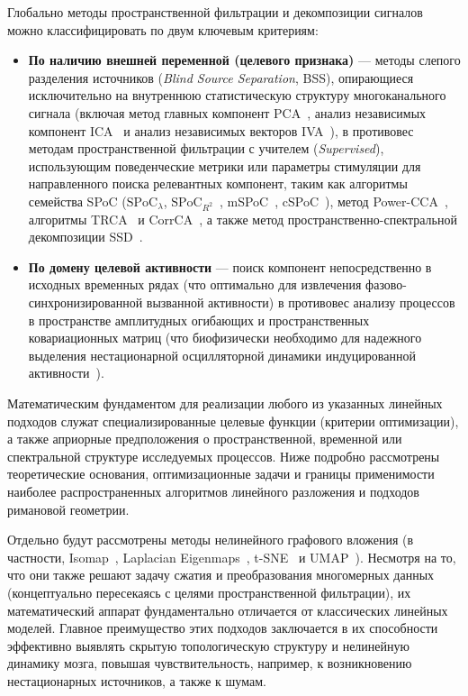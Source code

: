 Глобально методы пространственной фильтрации и декомпозиции сигналов можно классифицировать по двум ключевым критериям:
\begin{itemize}
	\item \textbf{По наличию внешней переменной (целевого признака)} --- методы слепого разделения источников (\textit{Blind Source Separation}, BSS), опирающиеся исключительно на внутреннюю статистическую структуру многоканального сигнала (включая метод главных компонент PCA~\cite{jolliffe1982notepca}, анализ независимых компонент ICA~\cite{makeig1996independent, hyvarinen2000independent, langlois2010introduction, sahonero2017comparison} и анализ независимых векторов IVA~\cite{Kim2006IVA, Chen2017}), в противовес методам пространственной фильтрации с учителем (\textit{Supervised}), использующим поведенческие метрики или параметры стимуляции для направленного поиска релевантных компонент, таким как алгоритмы семейства SPoC ($\text{SPoC}_{\lambda}$, $\text{SPoC}_{R^2}$~\cite{dahne2014spoc}, mSPoC~\cite{dahne2013mspoc}, cSPoC~\cite{dahne2014cspoc}), метод Power-CCA~\cite{ramirez2013powercca}, алгоритмы TRCA~\cite{tanaka2013trca} и CorrCA~\cite{zhang2018corrca, parra2019corrca}, а также метод пространственно-спектральной декомпозиции SSD~\cite{haufe2014dimensionality}.
	
	\item \textbf{По домену целевой активности} --- поиск компонент непосредственно в исходных временных рядах (что оптимально для извлечения фазово-синхронизированной вызванной активности) в противовес анализу процессов в пространстве амплитудных огибающих и пространственных ковариационных матриц (что биофизически необходимо для надежного выделения нестационарной осцилляторной динамики индуцированной активности~\cite{basar1997alpha, dahne2014spoc, pfurtscheller1999event}).
\end{itemize}

Математическим фундаментом для реализации любого из указанных линейных подходов служат специализированные целевые функции (критерии оптимизации), а также априорные предположения о пространственной, временной или спектральной структуре исследуемых процессов. Ниже подробно рассмотрены теоретические основания, оптимизационные задачи и границы применимости наиболее распространенных алгоритмов линейного разложения и подходов римановой геометрии. 

Отдельно будут рассмотрены методы нелинейного графового вложения (в частности, Isomap~\cite{tenenbaum2000isomap}, Laplacian Eigenmaps~\cite{belkin2003laplacian}, t-SNE~\cite{maaten2008tsne} и UMAP~\cite{mcinnes2018umap}). Несмотря на то, что они также решают задачу сжатия и преобразования многомерных данных (концептуально пересекаясь с целями пространственной фильтрации), их математический аппарат фундаментально отличается от классических линейных моделей. Главное преимущество этих подходов заключается в их способности эффективно выявлять скрытую топологическую структуру и нелинейную динамику мозга, повышая чувствительность, например, к возникновению нестационарных источников, а также к шумам.

